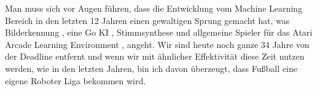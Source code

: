             \noindent
            Man muss sich vor Augen führen, dass die Entwicklung vom Machine Learning Bereich in den letzten 12 Jahren einen gewaltigen Sprung gemacht hat, was Bilderkennung \cite{NIPS2012_4824}, eine Go KI \cite{go}, Stimmsynthese \cite{wavenet} und allgemeine Spieler für das Atari Arcade Learning Environment \cite{Naddaf2010}, angeht. Wir sind heute noch ganze 34 Jahre von der Deadline entfernt und wenn wir mit ähnlicher Effektivität diese Zeit nutzen werden, wie in den letzten Jahren, bin ich davon überzeugt, dass Fußball eine eigene Roboter Liga bekommen wird.
